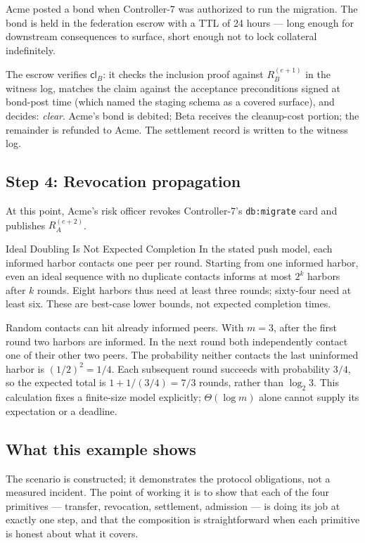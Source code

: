 \documentclass[11pt,a4paper]{article}
\theoremstyle{definition}
\theoremstyle{remark}
\begin{document}
Acme posted a bond when Controller-7 was authorized to run the migration. The bond is held in the federation escrow with a TTL of 24 hours --- long enough for downstream consequences to surface, short enough not to lock collateral indefinitely.

The escrow verifies $\mathsf{cl}_B$: it checks the inclusion proof against $R_B^{(e+1)}$ in the witness log, matches the claim against the acceptance preconditions signed at bond-post time (which named the staging schema as a covered surface), and decides: \emph{clear}. Acme's bond is debited; Beta receives the cleanup-cost portion; the remainder is refunded to Acme. The settlement record is written to the witness log.

\subsection{Step 4: Revocation propagation}\label{sec:fh-ex-revocation}

At this point, Acme's risk officer revokes Controller-7's \texttt{db:migrate} card and publishes $R_A^{(e+2)}$.

\begin{pdexample}{Ideal Doubling Is Not Expected Completion}
In the stated push model, each informed harbor contacts one peer per round.
Starting from one informed harbor, even an ideal sequence with no duplicate
contacts informs at most $2^k$ harbors after $k$ rounds. Eight harbors thus
need at least three rounds; sixty-four need at least six. These are best-case
lower bounds, not expected completion times.

Random contacts can hit already informed peers. With $m=3$, after the first
round two harbors are informed. In the next round both independently contact
one of their other two peers. The probability neither contacts the last
uninformed harbor is $(1/2)^2=1/4$. Each subsequent round succeeds with
probability $3/4$, so the expected total is $1+1/(3/4)=7/3$ rounds, rather
than $\log_2 3$. This calculation fixes a finite-size model explicitly;
$\Theta(\log m)$ alone cannot supply its expectation or a deadline.
\end{pdexample}

\subsection{What this example shows}\label{sec:fh-ex-shows}

%
The scenario is constructed; it demonstrates the protocol obligations, not a measured incident. The point of working it is to show that each of the four primitives --- transfer, revocation, settlement, admission --- is doing its job at exactly one step, and that the composition is straightforward when each primitive is honest about what it covers.
\end{document}

